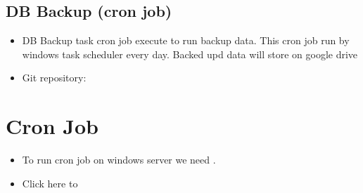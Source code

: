 \documentclass[letterpaper,10pt,english,openany,oneside]{sphinxmanual}
\begin{document}
\section{DB Backup (cron job)}
\label{\detokenize{Third Party/data-export-tool:db-backup-cron-job}}\begin{itemize}
\item {} 
\sphinxAtStartPar
DB Backup task cron job execute  to run backup data. This cron job run by windows task scheduler every day. Backed upd data will store on google drive

\item {} 
\sphinxAtStartPar
Git repository: 

\end{itemize}


\chapter{Cron Job}
\label{\detokenize{cron-job/cron-job:cron-job}}\label{\detokenize{cron-job/cron-job::doc}}\begin{itemize}
\item {} 
\sphinxAtStartPar
To run cron job on windows server we need .

\item {} 
\sphinxAtStartPar
Click here to 

\end{itemize}
\end{document}
